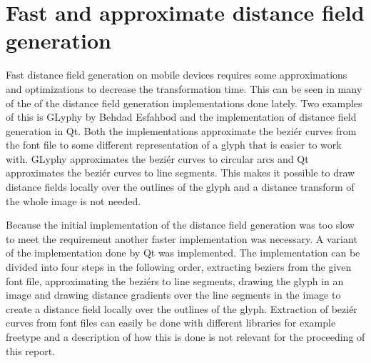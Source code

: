 \section{Fast and approximate distance field generation}
Fast distance field generation on mobile devices requires some approximations and optimizations to decrease the transformation time. This can be seen in many of the of the distance field generation implementations done lately. Two examples of this is GLyphy by Behdad Esfahbod and the implementation of distance field generation in Qt. Both the implementations approximate the beziér curves from the font file to some different representation of a glyph that is easier to work with. GLyphy approximates the beziér curves to circular arcs and Qt approximates the beziér curves to line segments. This makes it possible to draw distance fields locally over the outlines of the glyph and a distance transform of the whole image is not needed.

Because the initial implementation of the distance field generation was too slow to meet the requirement another faster implementation was necessary. A variant of the implementation done by Qt was implemented. The implementation can be divided into four steps in the following order, extracting beziers from the given font file, approximating the beziérs to line segments, drawing the glyph in an image and drawing distance gradients over the line segments in the image to create a distance field locally over the outlines of the glyph. Extraction of beziér curves from font files can easily be done with different libraries for example freetype and a description of how this is done is not relevant for the proceeding of this report. 
